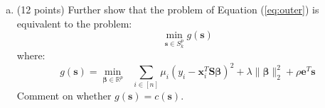 \documentclass{article}%
\newcommand{\R}{\mathbb{R}}
\begin{document}
\begin{enumerate}[(a)]
\item (12 points) Further show that the problem of Equation (\ref{eq:outer}) is equivalent to the problem:
\begin{equation}
    \label{eq:gouter}
    \min_{\bm{s}\in S_k^p}g(\bm{s})
\end{equation}
where:
\begin{equation}
    \label{eq:inner_g}
            g(\bm{s}) = \min_{\boldsymbol{\beta}\in \R^p} \text{  }\sum_{i\in[n]} \mu_i(y_i - \mathbf{x}^T_i \bm{S}\boldsymbol{\beta})^2  +\lambda \|\bm{\beta}\|_2^2 +\rho \bm{e}^T\bm{s}
\end{equation}
Comment on whether $g(\bm{s})=c(\bm{s})$.
\\
\begin{solution}


\end{solution}
\end{enumerate}
\end{document}
